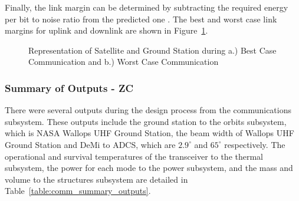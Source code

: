 \documentclass[12pt]{article}
\begin{document}
Finally, the link margin can be determined by subtracting the required energy per bit to noise ratio from the predicted one \cite[p.~478]{SMAD}. The best and worst case link margins for uplink and downlink are shown in Figure~\ref{fig:comm_cases}.


\begin{figure}
\hfill
{}
\hfill
{}
\hfill
\caption{Representation of Satellite and Ground Station during a.) Best Case Communication and b.) Worst Case Communication}
\label{fig:comm_cases}
\end{figure}
		
\subsubsection{Summary of Outputs - ZC}

There were several outputs during the design process from the communications subsystem. These outputs include the ground station to the orbits subsystem, which is NASA Wallops UHF Ground Station, the beam width of Wallops UHF Ground Station and DeMi to ADCS, which are $2.9^\circ$ and $65^\circ$ respectively. The operational and survival temperatures of the transceiver to the thermal subsystem, the power for each mode to the power subsystem, and the mass and volume to the structures subsystem are detailed in Table~\ref{table:comm_summary_outputs}.
	
\end{document}
